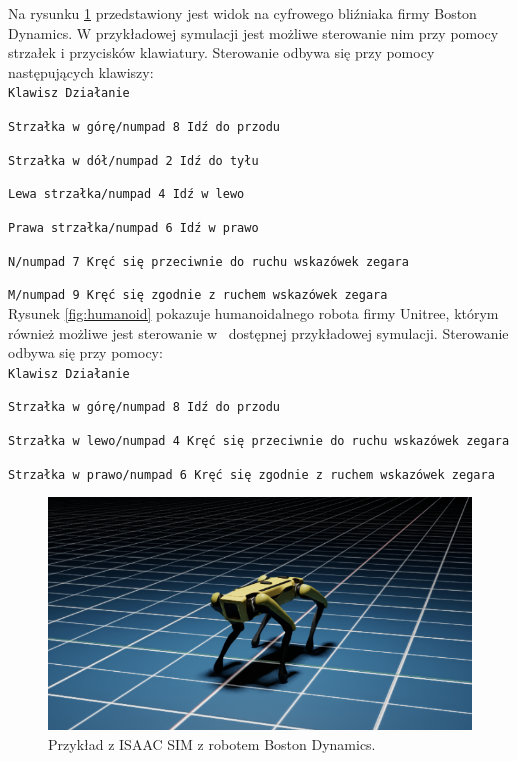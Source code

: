 \documentclass[12pt]{article}
\begin{document}
\newpage

\noindent Na rysunku \ref{fig:bostonDyna} przedstawiony jest widok na cyfrowego bliźniaka firmy Boston Dynamics. W przykładowej symulacji jest możliwe sterowanie nim przy pomocy strzałek i przycisków klawiatury. Sterowanie odbywa się przy pomocy następujących klawiszy: \\ 

\texttt{Klawisz  Działanie}

\texttt{Strzałka w górę/numpad 8  Idź do przodu}

\texttt{Strzałka w dół/numpad 2  Idź do tyłu}

\texttt{Lewa strzałka/numpad 4  Idź w lewo}

\texttt{Prawa strzałka/numpad 6  Idź w prawo}

\texttt{N/numpad 7  Kręć się przeciwnie do ruchu wskazówek zegara}

\texttt{M/numpad 9 Kręć się zgodnie z ruchem wskazówek zegara}\\

\noindent Rysunek \ref{fig:humanoid} pokazuje humanoidalnego robota firmy Unitree, którym również możliwe jest sterowanie w~ dostępnej przykładowej symulacji. Sterowanie odbywa się przy pomocy: \\

\texttt{Klawisz  Działanie}

\texttt{Strzałka w górę/numpad 8  Idź do przodu}

\texttt{Strzałka w lewo/numpad 4 Kręć się przeciwnie do ruchu wskazówek zegara}

\texttt{Strzałka w prawo/numpad 6 Kręć się zgodnie z ruchem wskazówek zegara}

\begin{figure}[h]
    \centering
    \includegraphics[width=0.8\linewidth]{Zdjęcia/przykladBoston.png}
    \caption{Przykład z ISAAC SIM z robotem Boston Dynamics.}
    \label{fig:bostonDyna}
\end{figure}
\end{document}
